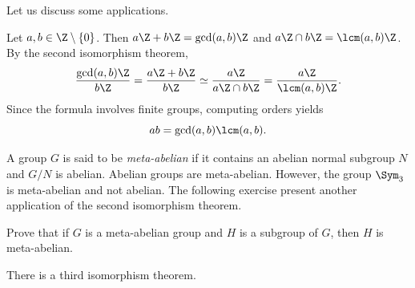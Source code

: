 Let us discuss some applications. 

\begin{example}
Let $a,b\in\Z\setminus\{0\}$. Then $a\Z+b\Z=\gcd(a,b)\Z$ and $a\Z\cap b\Z=\lcm(a,b)\Z$. By the second isomorphism theorem,
\[
\frac{\gcd(a,b)\Z}{b\Z}=\frac{a\Z+b\Z}{b\Z}\simeq
\frac{a\Z}{a\Z\cap b\Z}=\frac{a\Z}{\lcm(a,b)\Z}.
\]
Since the formula involves finite groups, 
computing orders yields 
\[
ab=\gcd(a,b)\lcm(a,b).
\]
\end{example}


\begin{optional}
A group $G$ is said to be \emph{meta-abelian}
if it contains an abelian normal subgroup $N$ and $G/N$
is abelian. Abelian groups are meta-abelian. However, the group $\Sym_3$ is meta-abelian and not abelian.  The following exercise
present another application of the second isomorphism theorem. 

\begin{xca}
Prove that if $G$ is a meta-abelian group and $H$ is a subgroup of
$G$, then $H$ is meta-abelian. 
\end{xca}
\end{optional}


There is a third isomorphism theorem. 



